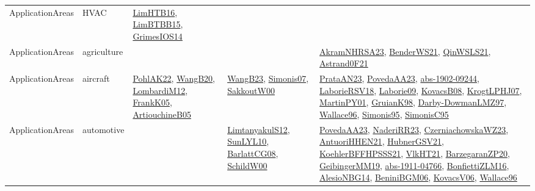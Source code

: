 {\begin{longtable}{lp{3cm}>{\raggedright}p{6cm}>{\raggedright}p{6cm}p{8cm}}
ApplicationAreas & HVAC & \href{papers/LimHTB16.pdf}{LimHTB16}\cite{LimHTB16}, \href{papers/LimBTBB15.pdf}{LimBTBB15}\cite{LimBTBB15}, \href{articles/GrimesIOS14.pdf}{GrimesIOS14}\cite{GrimesIOS14} &  & \\
ApplicationAreas & agriculture &  &  & \href{articles/AkramNHRSA23.pdf}{AkramNHRSA23}\cite{AkramNHRSA23}, \href{papers/BenderWS21.pdf}{BenderWS21}\cite{BenderWS21}, \href{articles/QinWSLS21.pdf}{QinWSLS21}\cite{QinWSLS21}, \href{papers/Astrand0F21.pdf}{Astrand0F21}\cite{Astrand0F21}\\
ApplicationAreas & aircraft & \href{articles/PohlAK22.pdf}{PohlAK22}\cite{PohlAK22}, \href{papers/WangB20.pdf}{WangB20}\cite{WangB20}, \href{articles/LombardiM12.pdf}{LombardiM12}\cite{LombardiM12}, \href{papers/FrankK05.pdf}{FrankK05}\cite{FrankK05}, \href{papers/ArtiouchineB05.pdf}{ArtiouchineB05}\cite{ArtiouchineB05} & \href{papers/WangB23.pdf}{WangB23}\cite{WangB23}, \href{articles/Simonis07.pdf}{Simonis07}\cite{Simonis07}, \href{articles/SakkoutW00.pdf}{SakkoutW00}\cite{SakkoutW00} & \href{articles/PrataAN23.pdf}{PrataAN23}\cite{PrataAN23}, \href{papers/PovedaAA23.pdf}{PovedaAA23}\cite{PovedaAA23}, \href{articles/abs-1902-09244.pdf}{abs-1902-09244}\cite{abs-1902-09244}, \href{articles/LaborieRSV18.pdf}{LaborieRSV18}\cite{LaborieRSV18}, \href{papers/Laborie09.pdf}{Laborie09}\cite{Laborie09}, \href{articles/KovacsB08.pdf}{KovacsB08}\cite{KovacsB08}, \href{papers/KrogtLPHJ07.pdf}{KrogtLPHJ07}\cite{KrogtLPHJ07}, \href{articles/MartinPY01.pdf}{MartinPY01}\cite{MartinPY01}, \href{papers/GruianK98.pdf}{GruianK98}\cite{GruianK98}, \href{articles/Darby-DowmanLMZ97.pdf}{Darby-DowmanLMZ97}\cite{Darby-DowmanLMZ97}, \href{articles/Wallace96.pdf}{Wallace96}\cite{Wallace96}, \href{papers/Simonis95.pdf}{Simonis95}\cite{Simonis95}, \href{papers/SimonisC95.pdf}{SimonisC95}\cite{SimonisC95}\\
ApplicationAreas & automotive &  & \href{articles/LimtanyakulS12.pdf}{LimtanyakulS12}\cite{LimtanyakulS12}, \href{papers/SunLYL10.pdf}{SunLYL10}\cite{SunLYL10}, \href{papers/BarlattCG08.pdf}{BarlattCG08}\cite{BarlattCG08}, \href{articles/SchildW00.pdf}{SchildW00}\cite{SchildW00} & \href{papers/PovedaAA23.pdf}{PovedaAA23}\cite{PovedaAA23}, \href{articles/NaderiRR23.pdf}{NaderiRR23}\cite{NaderiRR23}, \href{articles/CzerniachowskaWZ23.pdf}{CzerniachowskaWZ23}\cite{CzerniachowskaWZ23}, \href{papers/AntuoriHHEN21.pdf}{AntuoriHHEN21}\cite{AntuoriHHEN21}, \href{articles/HubnerGSV21.pdf}{HubnerGSV21}\cite{HubnerGSV21}, \href{articles/KoehlerBFFHPSSS21.pdf}{KoehlerBFFHPSSS21}\cite{KoehlerBFFHPSSS21}, \href{articles/VlkHT21.pdf}{VlkHT21}\cite{VlkHT21}, \href{papers/BarzegaranZP20.pdf}{BarzegaranZP20}\cite{BarzegaranZP20}, \href{papers/GeibingerMM19.pdf}{GeibingerMM19}\cite{GeibingerMM19}, \href{articles/abs-1911-04766.pdf}{abs-1911-04766}\cite{abs-1911-04766}, \href{papers/BonfiettiZLM16.pdf}{BonfiettiZLM16}\cite{BonfiettiZLM16}, \href{papers/AlesioNBG14.pdf}{AlesioNBG14}\cite{AlesioNBG14}, \href{papers/BeniniBGM06.pdf}{BeniniBGM06}\cite{BeniniBGM06}, \href{papers/KovacsV06.pdf}{KovacsV06}\cite{KovacsV06}, \href{articles/Wallace96.pdf}{Wallace96}\cite{Wallace96}\\

\end{longtable}}

